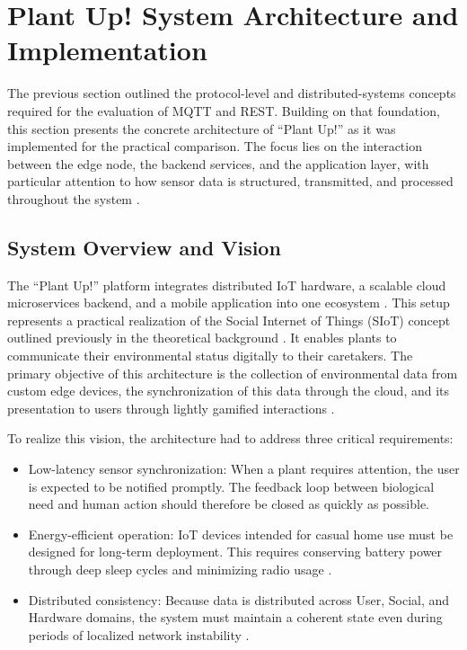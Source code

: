 \section{Plant Up! System Architecture and Implementation}

The previous section outlined the protocol-level and distributed-systems concepts required for the evaluation of MQTT and REST. Building on that foundation, this section presents the concrete architecture of ``Plant Up!'' as it was implemented for the practical comparison. The focus lies on the interaction between the edge node, the backend services, and the application layer, with particular attention to how sensor data is structured, transmitted, and processed throughout the system \cite{nistNoT2016, cheThreeTier}.

\subsection{System Overview and Vision}
The ``Plant Up!'' platform integrates distributed IoT hardware, a scalable cloud microservices backend, and a mobile application into one ecosystem \cite{nistNoT2016, fowlerMicroservices}. This setup represents a practical realization of the Social Internet of Things (SIoT) concept outlined previously in the theoretical background \cite{atzoriSiot2012, jungWeon2025}. It enables plants to communicate their environmental status digitally to their caretakers. The primary objective of this architecture is the collection of environmental data from custom edge devices, the synchronization of this data through the cloud, and its presentation to users through lightly gamified interactions \cite{deterding2011, barariGamification2024}.

To realize this vision, the architecture had to address three critical requirements:
\begin{itemize}
    \item Low-latency sensor synchronization: When a plant requires attention, the user is expected to be notified promptly. The feedback loop between biological need and human action should therefore be closed as quickly as possible.
    \item Energy-efficient operation: IoT devices intended for casual home use must be designed for long-term deployment. This requires conserving battery power through deep sleep cycles and minimizing radio usage \cite{espIdfS3SleepModes, esp32s3Datasheet2026}.
    \item Distributed consistency: Because data is distributed across User, Social, and Hardware domains, the system must maintain a coherent state even during periods of localized network instability \cite{richardsonDbPerService, gilbertLynchCap2002}.
\end{itemize}

